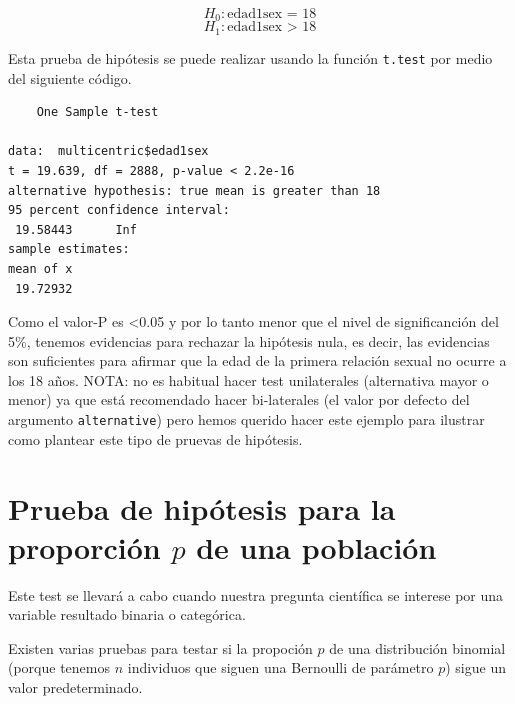 \documentclass[
]{book}
\newenvironment{Shaded}{\begin{snugshade}}{\end{snugshade}}
\newcommand{\AttributeTok}[1]{\textcolor[rgb]{0.77,0.63,0.00}{#1}}
\newcommand{\DecValTok}[1]{\textcolor[rgb]{0.00,0.00,0.81}{#1}}
\newcommand{\FunctionTok}[1]{\textcolor[rgb]{0.00,0.00,0.00}{#1}}
\newcommand{\NormalTok}[1]{#1}
\newcommand{\SpecialCharTok}[1]{\textcolor[rgb]{0.00,0.00,0.00}{#1}}
\newcommand{\StringTok}[1]{\textcolor[rgb]{0.31,0.60,0.02}{#1}}
\begin{document}
\[H_0: \text{edad1sex = 18}\]
\[H_1: \text{edad1sex > 18}\]

Esta prueba de hipótesis se puede realizar usando la función \texttt{t.test} por medio del siguiente código.

\begin{Shaded}
\end{Shaded}

\begin{verbatim}
    One Sample t-test

data:  multicentric$edad1sex
t = 19.639, df = 2888, p-value < 2.2e-16
alternative hypothesis: true mean is greater than 18
95 percent confidence interval:
 19.58443      Inf
sample estimates:
mean of x 
 19.72932 
\end{verbatim}

Como el valor-P es \textless0.05 y por lo tanto menor que el nivel de significanción del 5\%, tenemos evidencias para rechazar la hipótesis nula, es decir, las evidencias son suficientes para afirmar que la edad de la primera relación sexual no ocurre a los 18 años. NOTA: no es habitual hacer test unilaterales (alternativa mayor o menor) ya que está recomendado hacer bi-laterales (el valor por defecto del argumento \texttt{alternative}) pero hemos querido hacer este ejemplo para ilustrar como plantear este tipo de pruevas de hipótesis.

\hypertarget{prueba-de-hipuxf3tesis-para-la-proporciuxf3n-p-de-una-poblaciuxf3n}{%
\section{\texorpdfstring{Prueba de hipótesis para la proporción \(p\) de una población}{Prueba de hipótesis para la proporción p de una población}}\label{prueba-de-hipuxf3tesis-para-la-proporciuxf3n-p-de-una-poblaciuxf3n}}

Este test se llevará a cabo cuando nuestra pregunta científica se interese por una variable resultado binaria o categórica.

Existen varias pruebas para testar si la propoción \(p\) de una distribución binomial (porque tenemos \(n\) individuos que siguen una Bernoulli de parámetro \(p\)) sigue un valor predeterminado.
\end{document}
